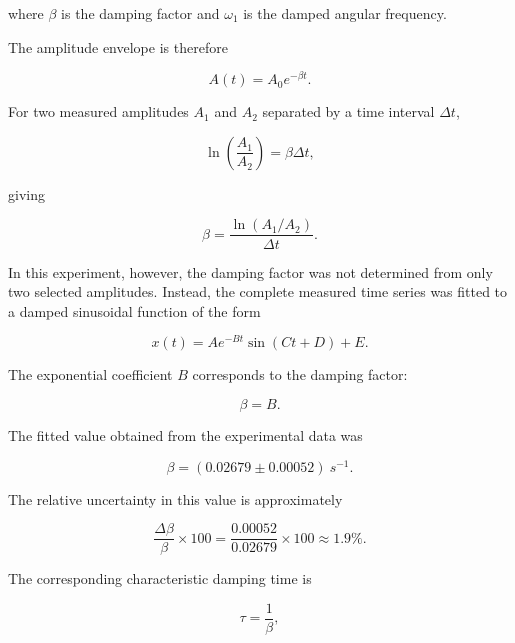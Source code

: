 \documentclass[12pt,a4paper]{article}
\begin{document}
where $\beta$ is the damping factor and $\omega_1$ is the damped angular frequency.

The amplitude envelope is therefore

\begin{equation}
A(t)=A_0e^{-\beta t}.
\label{eq:envelope}
\end{equation}

For two measured amplitudes $A_1$ and $A_2$ separated by a time interval $\Delta t$,

\begin{equation}
\ln\left(\frac{A_1}{A_2}\right)=\beta\Delta t,
\label{eq:damping}
\end{equation}

giving

\begin{equation}
\beta=
\frac{\ln(A_1/A_2)}{\Delta t}.
\label{eq:beta}
\end{equation}

In this experiment, however, the damping factor was not determined from only two selected amplitudes. Instead, the complete measured time series was fitted to a damped sinusoidal function of the form

\begin{equation}
x(t)=Ae^{-Bt}\sin(Ct+D)+E.
\label{eq:fit}
\end{equation}

The exponential coefficient $B$ corresponds to the damping factor:

\begin{equation}
\boxed{\beta=B}.
\end{equation}

The fitted value obtained from the experimental data was

\begin{equation}
\boxed{\beta=(0.02679\pm0.00052)\ \si{s^{-1}}}.
\end{equation}

The relative uncertainty in this value is approximately

\begin{equation}
\frac{\Delta\beta}{\beta}\times100
=
\frac{0.00052}{0.02679}\times100
\approx1.9\%.
\end{equation}

The corresponding characteristic damping time is

\begin{equation}
\tau=\frac{1}{\beta},
\end{equation}
\end{document}
